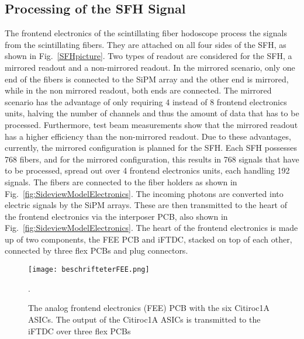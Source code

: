 \subsection{Processing of the SFH Signal}
The frontend electronics of the scintillating fiber hodoscope process the signals from the scintillating fibers.
They are attached on all four sides of the SFH, as shown in Fig.~\ref{SFHpicture}.
\newline 
Two types of readout are considered for the SFH, a mirrored readout and a non-mirrored readout.
In the mirrored scenario, only one end of the fibers is connected to the SiPM array and the other end is mirrored,
while in the non mirrored readout, both ends are connected\autocite{InternalcommunicationKarl}.
\newline
The mirrored scenario has the advantage of only requiring 4 instead of 8 frontend electronics units, halving the number of channels and thus the amount of data that has to be processed.
Furthermore, test beam measurements show that the mirrored readout has a higher efficiency than the non-mirrored readout\autocite{InternalcommunicationIgor}.
\newline
Due to these advantages, currently, the mirrored configuration is planned for the SFH\autocite{InternalcommunicationKarl}.
\newline
Each SFH possesses 768 fibers, and for the mirrored configuration, this results in 768 signals that have to be processed, spread out over 4 frontend electronics units, each handling 192 signals. 
\newline
The fibers are connected to the fiber holders as shown in Fig.~\ref{fig:SideviewModelElectronics}.
The incoming photons are converted into electric signals by the SiPM arrays.
\newline
These are then transmitted to the heart of the frontend electronics via the interposer PCB, also shown in Fig.~\ref{fig:SideviewModelElectronics}.
\newline
The heart of the frontend electronics is made up of two components, the FEE PCB and iFTDC, stacked on top of each other,
connected by three flex PCBs and plug connectors.
\newline
\begin{figure}[H]
    \centering
    \texttt{[image: beschrifteterFEE.png]}
    \caption{The analog frontend electronics (FEE) PCB with the six Citiroc1A ASICs.
    The output of the Citiroc1A ASICs is transmitted to the iFTDC over three flex PCBs\autocite{InternalcommunicationKarl}}.
    \label{fig:FEE}
\end{figure}
